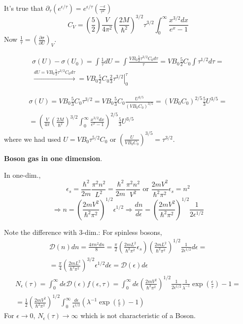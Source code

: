 \documentclass[twoside]{amsart}
\theoremstyle{plain}
\theoremstyle{definition}
\newcommand{\solutionhead}[1]
  {
   \noindent{\small\bf Solution #1.}
   }
\begin{document}
It's true that $\partial_{\tau} ( e^{\epsilon/\tau} ) = e^{\epsilon/ \tau} \left( \frac{ -\epsilon}{\tau^2} \right)$
\[
C_V = \left( \frac{5}{2} \right) \frac{V}{4 \pi^2} \left( \frac{ 2M}{\hbar^2} \right)^{3/2} \tau^{3/2} \int_0^{\infty} \frac{ x^{3/2}dx}{ e^x  -1 }
\]
Now $\frac{1}{\tau} = \left( \frac{ \partial \sigma}{ \partial U} \right)_V$.  

\[
\begin{gathered}
  \sigma(U) - \sigma(U_0) = \int \frac{1}{\tau} dU =  \int \frac{ VB_0 \frac{5}{2} \tau^{3/2} C_0 d\tau }{ \tau} = VB_0 \frac{5}{2} C_0 \int \tau^{1/2} d\tau = \\ 
  \xrightarrow{ dU = VB_0 \frac{5}{2} \tau^{3/2} C_0 d\tau } = \left. VB_0 \frac{5}{2} C_0 \frac{2}{3} \tau^{3/2} \right|_0^{\tau}
\end{gathered}
\]

\[
\begin{gathered}
  \sigma(U) = VB_0 \frac{5}{3} C_0 \tau^{3/2} = VB_0 \frac{5}{3} C_0 \frac{U^{3/5}}{ (VB_0 C_0)^{3/5} } = (VB_0 C_0)^{2/5} \frac{5}{3} U^{3/5} = \\ 
  = \left( \frac{V}{4\pi} \left( \frac{2M}{ \hbar^2} \right)^{3/2} \int_0^{\infty} \frac{ x^{3/2} dx }{ e^x - 1 } \right)^{2/5} \frac{5}{3} U^{3/5}
\end{gathered}
\]
where we had used $U = VB_0 \tau^{5/2} C_0$ or $\left( \frac{ U}{VB_0 C_0 } \right)^{3/5} = \tau^{3/2}$.  

\solutionhead{9} \textbf{Boson gas in one dimension}. 

In one-dim., 
\[
\epsilon_s = \frac{ \hbar^2}{2m} \frac{ \pi^2 n^2}{L^2} = \frac{ \hbar^2}{2m } \frac{\pi^2 n ^2}{V^2} \text{ or } \frac{ 2 m V^2}{\hbar^2 \pi^2} \epsilon_s = n^2
\]
\[
\Longrightarrow n = \left( \frac{ 2 m V^2}{ \hbar^2 \pi^2} \right)^{1/2} \epsilon^{1/2} \Longrightarrow \frac{dn}{d\epsilon} = \left( \frac{ 2 m V^2}{ \hbar^2 \pi^2 } \right)^{1/2} \frac{1}{2 \epsilon^{1/2}}
\]

Note the difference with 3-dim.: For spinless bosons, 
\[
\begin{gathered}
\mathcal{D}(n) dn = \frac{ 4 \pi n^2 dn }{8} = \frac{\pi}{2} \left( \frac{ 2m L^2}{ \hbar^2 \pi^2} \epsilon_s \right) \left( \frac{ 2 mL^2}{ \hbar^2 \pi^2} \right)^{1/2} \frac{1}{2 \epsilon^{1/2}} d\epsilon = \\
= \frac{\pi}{4} \left( \frac{ 2 m L^2}{ \hbar^2 \pi^2} \right)^{3/2} \epsilon^{1/2} d\epsilon = \mathcal{D}(\epsilon) d\epsilon
\end{gathered}
\]
\[
\begin{gathered}
  N_{\epsilon}( \tau) = \int_0^{\infty} d\epsilon \mathcal{D}(\epsilon) f(\epsilon,\tau) = \int_0^{\infty} d\epsilon \left( \frac{ 2 m V^2}{ \hbar^2 \pi^2 } \right)^{1/2} \frac{1}{2\epsilon^{1/2}} \frac{ 1 }{ \lambda^{-1}} \exp{ \left( \frac{ \epsilon}{ \tau} \right) - 1 } =  \\
     = \frac{1}{2} \left( \frac{ 2 m V^2 }{ \hbar^2 \pi^2} \right)^{1/2} \int_0^{\infty} \frac{ d \epsilon}{ \epsilon^{1/2}} (\lambda^{-1} \exp{ \left( \frac{ \epsilon}{\tau} \right)} - 1 )
\end{gathered}
\]
For $\epsilon \to 0$, $N_{ \epsilon}(\tau) \to \infty$ which is not characteristic of a Boson.  
\end{document}
